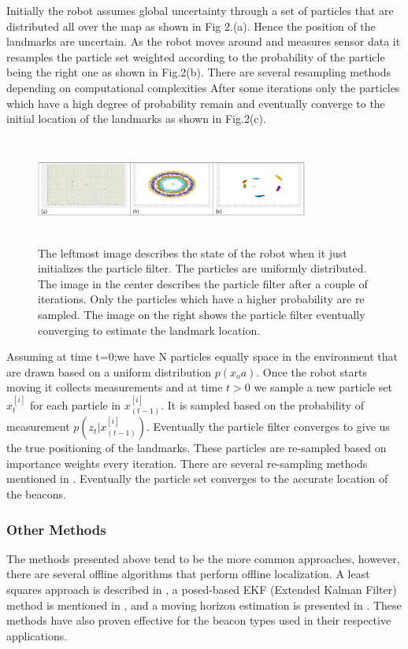 \documentclass[conference]{IEEEtran}
\begin{document}
				Initially the robot assumes global uncertainty through a set of particles that are distributed all over the map as shown in Fig 2.(a). Hence the position of the landmarks are uncertain. As the robot moves around and measures sensor data it resamples the particle set weighted according to the probability of the particle being the right one as shown in Fig.2(b). There are several resampling methods depending on computational complexities \cite{Li2015} After some iterations only the particles which have a high degree of probability  remain and eventually converge to the initial location of the landmarks as shown in Fig.2(c).
				\begin{figure}[h!]
					\centering
					\includegraphics[height=35mm,width=90mm]{Particle_filter_method.JPG}
					\caption{The leftmost image describes the state of the robot when it just initializes the particle filter. The particles are uniformly distributed. The image in the center describes the particle filter after a couple of iterations. Only the particles which have a higher probability are re sampled. The image on the right shows the particle filter eventually converging to estimate the landmark location. }
					
				\end{figure}
				Assuming at time t=0;we have N particles equally space in the environment that are drawn based on a uniform distribution $ p(x_oa)$.                                                                       
				Once the robot starts moving it collects measurements and at time $t>0$ we sample a new particle set $x^{[i]}_t$ for each particle in $x^{[i]}_{(t-1)}$. It is sampled based on the probability of measurement $p(z_t|x^{[i]}_{(t-1)})$. Eventually the particle filter converges to give us the true positioning of the landmarks.
				 These particles are re-sampled based on importance weights every iteration. There are several re-sampling methods mentioned in \cite{Li2015}. Eventually the particle set converges to the accurate location of the beacons. 
				
			\subsubsection{Other Methods}
			 	The methods presented above tend to be the more common approaches, however, there are several offline algorithms that perform offline localization. A least squares approach is described in \cite{Newman}, a posed-based EKF (Extended Kalman Filter) method is mentioned in \cite{Webster2012}, and a moving horizon estimation is presented in \cite{Vallicrosa2014a}. These methods have also proven effective for the beacon types used in their respective applications.
			
\end{document}
